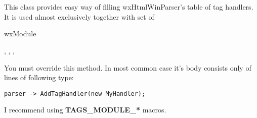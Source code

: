 %

\section{}\label{wxhtmltagsmodule}

This class provides easy way of filling wxHtmlWinParser's table of
tag handlers. It is used almost exclusively together with set of


wxModule


,
,
,


\label{wxhtmltagsmodulefillhandlerstable}


You must override this method. In most common case it's body consists
only of lines of following type:

\begin{verbatim}
parser -> AddTagHandler(new MyHandler);
\end{verbatim}

I recommend using {\bf TAGS\_MODULE\_*} macros.



